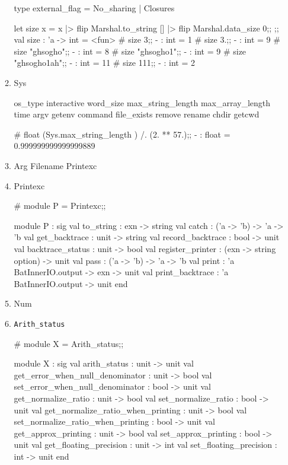 \begin{enumerate}
\begin{enumerate}
\begin{alternate}
type external_flag = No_sharing | Closures

let size x = x |> flip Marshal.to_string [] |> flip Marshal.data_size 0;;           ;;
val size : 'a -> int = <fun>
# size 3;;
- : int = 1
# size 3.;;
- : int = 9
# size "ghsogho";;
- : int = 8
# size "ghsogho1";;
- : int = 9
# size "ghsogho1ah";;
- : int = 11
# size 111;;
- : int = 2
\end{alternate}


    \item Sys

\begin{ocamlcode}
os_type interactive word_size max_string_length
max_array_length time argv getenv command file_exists
remove rename chdir getcwd 
\end{ocamlcode}

\begin{alternate}
# float (Sys.max_string_length ) /. (2. ** 57.);;
- : float = 0.999999999999999889
\end{alternate}


    \item Arg Filename Printexc
    \item Printexc

\begin{ocamlcode}
# module P = Printexc;;
\end{ocamlcode}

\begin{ocamlcode}
module P :
  sig
    val to_string : exn -> string
    val catch : ('a -> 'b) -> 'a -> 'b
    val get_backtrace : unit -> string
    val record_backtrace : bool -> unit
    val backtrace_status : unit -> bool
    val register_printer : (exn -> string option) -> unit
    val pass : ('a -> 'b) -> 'a -> 'b
    val print : 'a BatInnerIO.output -> exn -> unit
    val print_backtrace : 'a BatInnerIO.output -> unit
  end
\end{ocamlcode}


    \item Num
    \item \verb|Arith_status|

\begin{ocamlcode}
# module X = Arith_status;;
\end{ocamlcode}
\begin{ocamlcode}
module X :
  sig
    val arith_status : unit -> unit
    val get_error_when_null_denominator : unit -> bool
    val set_error_when_null_denominator : bool -> unit
    val get_normalize_ratio : unit -> bool
    val set_normalize_ratio : bool -> unit
    val get_normalize_ratio_when_printing : unit -> bool
    val set_normalize_ratio_when_printing : bool -> unit
    val get_approx_printing : unit -> bool
    val set_approx_printing : bool -> unit
    val get_floating_precision : unit -> int
    val set_floating_precision : int -> unit
  end
\end{ocamlcode}



\end{enumerate}
\end{enumerate}
